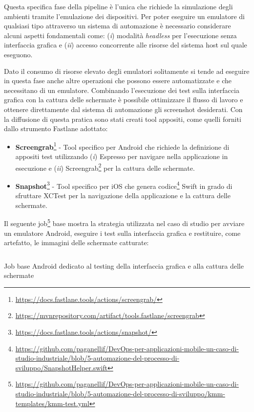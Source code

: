 Questa specifica fase della pipeline è l'unica che richiede la simulazione degli ambienti tramite l'emulazione dei dispositivi. Per poter eseguire un emulatore di qualsiasi tipo attraverso un sistema di automazione è necessario considerare alcuni aspetti fondamentali come: (\textit{i}) modalità \textit{headless} per l'esecuzione senza interfaccia grafica e (\textit{ii}) accesso concorrente alle risorse del sistema host sul quale eseguono.

Dato il consumo di risorse elevato degli emulatori solitamente si tende ad eseguire in questa fase anche altre operazioni che possono essere automatizzate e che necessitano di un emulatore. Combinando l'esecuzione dei test sulla interfaccia grafica con la cattura delle schermate è possibile ottimizzare il flusso di lavoro e ottenere direttamente dal sistema di automazione gli screenshot desiderati. Con la diffusione di questa pratica sono stati creati tool appositi, come quelli forniti dallo strumento Fastlane adottato:

\begin{itemize}
    \item \textbf{Screengrab}\footnote{\href{https://docs.fastlane.tools/actions/screengrab/}{https://docs.fastlane.tools/actions/screengrab/}} - Tool specifico per Android che richiede la definizione di appositi test utilizzando (\textit{i}) Espresso per navigare nella applicazione in esecuzione e (\textit{ii}) Screengrab\footnote{\href{https://mvnrepository.com/artifact/tools.fastlane/screengrab}{https://mvnrepository.com/artifact/tools.fastlane/screengrab}} per la cattura delle schermate.
    \item \textbf{Snapshot}\footnote{\href{https://docs.fastlane.tools/actions/snapshot/}{https://docs.fastlane.tools/actions/snapshot/}} - Tool specifico per iOS che genera codice\footnote{\href{https://github.com/paganellif/DevOps-per-applicazioni-mobile-un-caso-di-studio-industriale/blob/5-automazione-del-processo-di-sviluppo/SnapshotHelper.swift}{https://github.com/paganellif/DevOps-per-applicazioni-mobile-un-caso-di-studio-industriale/blob/5-automazione-del-processo-di-sviluppo/SnapshotHelper.swift}} Swift in grado di sfruttare XCTest per la navigazione della applicazione e la cattura delle schermate.
\end{itemize}

Il seguente job\footnote{\href{https://github.com/paganellif/DevOps-per-applicazioni-mobile-un-caso-di-studio-industriale/blob/5-automazione-del-processo-di-sviluppo/kmm-templates/kmm-test.yml}{https://github.com/paganellif/DevOps-per-applicazioni-mobile-un-caso-di-studio-industriale/blob/5-automazione-del-processo-di-sviluppo/kmm-templates/kmm-test.yml}} base mostra la strategia utilizzata nel caso di studio per avviare un emulatore Android, eseguire i test sulla interfaccia grafica e restituire, come artefatto, le immagini delle schermate catturate:
\begin{listing}[H]
    \inputminted{yaml}{code/base-ui-test-android.yaml}
    \caption{Job base Android dedicato al testing della interfaccia grafica e alla cattura delle schermate}
\end{listing}

